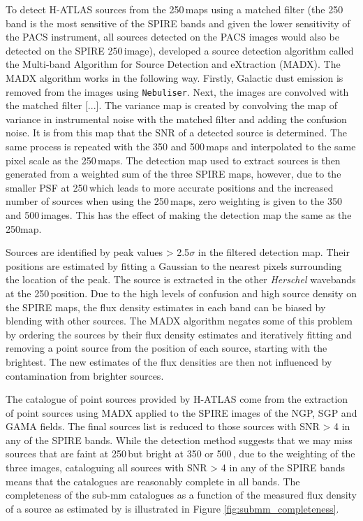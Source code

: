 To detect H-ATLAS sources from the 250\,\micron maps using a matched filter (the 250\,\micron band is the most sensitive of the SPIRE bands and given the lower sensitivity of the PACS instrument, all sources detected on the PACS images would also be detected on the SPIRE 250\,\micron image), \citealt{Maddox_2020} developed a source detection algorithm called the Multi-band Algorithm for Source Detection and eXtraction (MADX). The MADX algorithm works in the following way. Firstly, Galactic dust emission is removed from the images using \texttt{Nebuliser}. Next, the images are convolved with the matched filter [...]. The variance map is created by convolving the map of variance in instrumental noise with the matched filter and adding the confusion noise. It is from this map that the SNR of a detected source is determined. The same process is repeated with the 350 and 500\,\micron maps and interpolated to the same pixel scale as the 250\,\micron maps. The detection map used to extract sources is then generated from a weighted sum of the three SPIRE maps, however, due to the smaller PSF at 250\,\micron which leads to more accurate positions and the increased number of sources when using the 250\,\micron maps, zero weighting is given to the 350 and 500\,\micron images. This has the effect of making the detection map the same as the 250\micron map.

Sources are identified by peak values > 2.5$\sigma$ in the filtered detection map. Their positions are estimated by fitting a Gaussian to the nearest pixels surrounding the location of the peak. The source is extracted in the other \textit{Herschel} wavebands at the 250\,\micron position. Due to the high levels of confusion and high source density on the SPIRE maps, the flux density estimates in each band can be biased by blending with other sources. The MADX algorithm negates some of this problem by ordering the sources by their flux density estimates and iteratively fitting and removing a point source from the position of each source, starting with the brightest. The new estimates of the flux densities are then not influenced by contamination from brighter sources.

The catalogue of point sources provided by H-ATLAS come from the extraction of point sources using MADX applied to the SPIRE images of the NGP, SGP and GAMA fields. The final sources list is reduced to those sources with SNR > 4 in any of the SPIRE bands. While the detection method suggests that we may miss sources that are faint at 250\,\micron but bright at 350 or 500\,\micron, due to the weighting of the three images, cataloguing all sources with SNR > 4 in any of the SPIRE bands means that the catalogues are reasonably complete in all bands. The completeness of the sub-mm catalogues as a function of the measured flux density of a source as estimated by \citealt{Valiante_2016} is illustrated in Figure \ref{fig:submm_completeness}.

